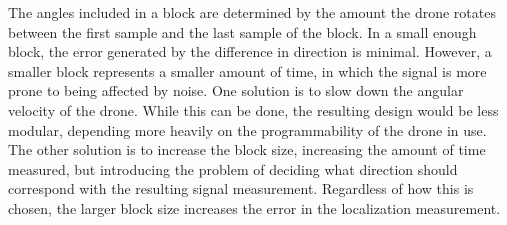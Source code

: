 The angles included in a block are determined by the amount the drone rotates between the first sample and the last sample of the block. In a small enough block, the error generated by the difference in direction is minimal. However, a smaller block represents a smaller amount of time, in which the signal is more prone to being affected by noise. One solution is to slow down the angular velocity of the drone. While this can be done, the resulting design would be less modular, depending more heavily on the programmability of the drone in use. The other solution is to increase the block size, increasing the amount of time measured, but introducing the problem of deciding what direction should correspond with the resulting signal measurement. Regardless of how this is chosen, the larger block size increases the error in the localization measurement.\par 

